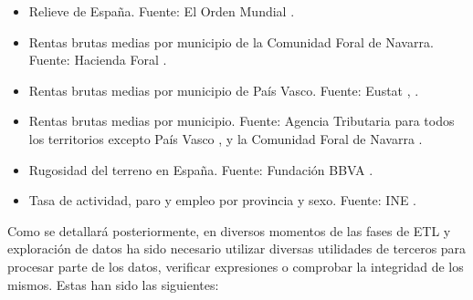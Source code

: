 \begin{itemize}
    \item Relieve de España. Fuente: El Orden Mundial \cite{relieve}.
    \item Rentas brutas medias por municipio de la Comunidad Foral de Navarra. Fuente: Hacienda Foral \cite{renta_navarra}.
    \item Rentas brutas medias por municipio de País Vasco. Fuente: Eustat \cite{renta_euskadi}, \cite{PIB_pais_vasco}.
    \item Rentas brutas medias por municipio. Fuente: Agencia Tributaria para todos los territorios excepto País Vasco \cite{renta}, y la Comunidad Foral de Navarra \cite{renta_navarra}.
    \item Rugosidad del terreno en España. Fuente: Fundación BBVA \cite{rugosidad}.
    \item Tasa de actividad, paro y empleo por provincia y sexo. Fuente: INE \cite{INE_empleo}.
\end{itemize}

Como se detallará posteriormente, en diversos momentos de las fases de ETL y exploración de datos ha sido necesario utilizar diversas utilidades de terceros para procesar parte de los datos, verificar expresiones o comprobar la integridad de los mismos. Estas han sido las siguientes:

